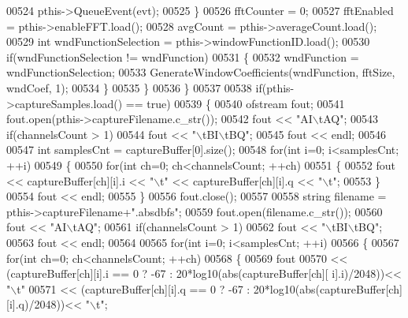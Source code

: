 \begin{DoxyCode}
{{{00524                 pthis->QueueEvent(evt);
00525             \}
00526             fftCounter = 0;
00527             fftEnabled = pthis->enableFFT.load();
00528             avgCount = pthis->averageCount.load();
00529             \textcolor{keywordtype}{int} wndFunctionSelection = pthis->windowFunctionID.load();
00530             \textcolor{keywordflow}{if}(wndFunctionSelection != wndFunction)
00531             \{
00532                 wndFunction = wndFunctionSelection;
00533                 GenerateWindowCoefficients(wndFunction, fftSize, wndCoef, 1);
00534             \}
00535         \}
00536     \}
00537 
00538     \textcolor{keywordflow}{if}(pthis->captureSamples.load() == \textcolor{keyword}{true})
00539     \{
00540         ofstream fout;
00541         fout.open(pthis->captureFilename.c\_str());
00542         fout << \textcolor{stringliteral}{"AI\(\backslash\)tAQ"};
00543         \textcolor{keywordflow}{if}(channelsCount > 1)
00544             fout << \textcolor{stringliteral}{"\(\backslash\)tBI\(\backslash\)tBQ"};
00545         fout << endl;
00546 
00547         \textcolor{keywordtype}{int} samplesCnt = captureBuffer[0].size();
00548         \textcolor{keywordflow}{for}(\textcolor{keywordtype}{int} i=0; i<samplesCnt; ++i)
00549         \{
00550             \textcolor{keywordflow}{for}(\textcolor{keywordtype}{int} ch=0; ch<channelsCount; ++ch)
00551             \{
00552                 fout << captureBuffer[ch][i].i << \textcolor{stringliteral}{"\(\backslash\)t"} << captureBuffer[ch][i].q << \textcolor{stringliteral}{"\(\backslash\)t"};
00553             \}
00554             fout << endl;
00555         \}
00556         fout.close();
00557 
00558         \textcolor{keywordtype}{string} filename = pthis->captureFilename+\textcolor{stringliteral}{".absdbfs"};
00559         fout.open(filename.c\_str());
00560         fout << \textcolor{stringliteral}{"AI\(\backslash\)tAQ"};
00561         \textcolor{keywordflow}{if}(channelsCount > 1)
00562             fout << \textcolor{stringliteral}{"\(\backslash\)tBI\(\backslash\)tBQ"};
00563         fout << endl;
00564 
00565         \textcolor{keywordflow}{for}(\textcolor{keywordtype}{int} i=0; i<samplesCnt; ++i)
00566         \{
00567             \textcolor{keywordflow}{for}(\textcolor{keywordtype}{int} ch=0; ch<channelsCount; ++ch)
00568             \{
00569                 fout
00570                 << (captureBuffer[ch][i].i == 0 ? -67 : 20*log10(abs(captureBuffer[ch][
      i].i)/2048))<< \textcolor{stringliteral}{"\(\backslash\)t"}
00571                 << (captureBuffer[ch][i].q == 0 ? -67 : 20*log10(abs(captureBuffer[ch][i].q)/2048))<< \textcolor{stringliteral}{"\(\backslash\)t"};
}}}
\end{DoxyCode}
